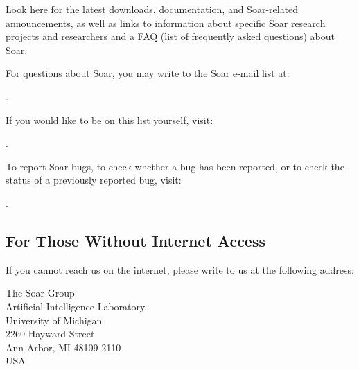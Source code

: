 Look here for the latest downloads, documentation, and Soar-related announcements, as well
as links to information about specific Soar research projects and researchers and a FAQ
(list of frequently asked questions) about Soar.

For questions about Soar, you may write to the Soar e-mail list at:

\hspace{2em}.

If you would like to be on this list yourself, visit:

\hspace{2em}.

To report Soar bugs, to check whether a bug has been reported, or to check the status
of a previously reported bug, visit:

\hspace{2em}.


 




\subsection*{For Those Without Internet Access}

If you cannot reach us on the internet, please write to us at the following 
address:

\begin{flushleft}
\hspace{2em}The Soar Group \\
\hspace{2em}Artificial Intelligence Laboratory \\
\hspace{2em}University of Michigan\\
\hspace{2em}2260 Hayward Street\\
\hspace{2em}Ann Arbor, MI 48109-2110 \\
\hspace{2em}USA 
\end{flushleft}

